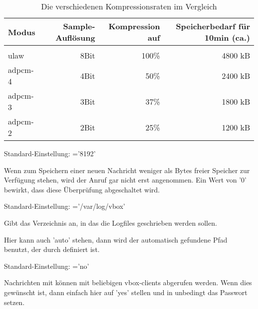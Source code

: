 \begin{description}
    \begin{table}[htbp]
      \begin{tabular}{lrrr}
        Modus    & Sample-Auflösung & Kompression auf & Speicherbedarf für 10min (ca.) \\
        \hline \\
        ulaw     & 8Bit             & 100\%           & 4800 kB       \\
        adpcm-4  & 4Bit             &  50\%           & 2400 kB       \\
        adpcm-3  & 3Bit             &  37\%           & 1800 kB       \\
        adpcm-2  & 2Bit             &  25\%           & 1200 kB       \\
      \end{tabular}
      \caption{Die verschiedenen Kompressionsraten im Vergleich}
    \end{table}


    Standard-Einstellung: ='8192'

    Wenn zum Speichern einer neuen Nachricht weniger als  Bytes 
    freier Speicher zur Verfügung stehen, wird der Anruf gar nicht erst angenommen. 
    Ein Wert von '0' bewirkt, dass diese Überprüfung abgeschaltet wird.
 

    Standard-Einstellung: ='/var/log/vbox'

    Gibt das Verzeichnis an, in das die Logfiles geschrieben werden sollen.

    Hier kann auch 'auto' stehen, dann wird der automatisch gefundene Pfad benutzt, der durch  definiert ist.


    Standard-Einstellung: ='no'
    
    Nachrichten mit können mit beliebigen vbox-clients abgerufen werden. 
    Wenn dies gewünscht ist, dann einfach hier auf 'yes' stellen und in
     unbedingt das Passwort setzen.
    



\end{description}
